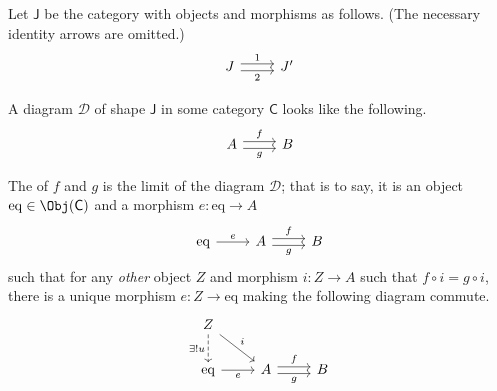 \documentclass[notes.tex]{subfiles}
\begin{document}
\begin{definition}[equalizer]
  \label{def:equalizer}
  Let $\mathsf{J}$ be the category with objects and morphisms as follows. (The necessary identity arrows are omitted.)
  \begin{equation*}
    \begin{tikzcd}
      J
      \arrow[r, shift left, "1"]
      \arrow[r, shift right, swap, "2"]
      & J'
    \end{tikzcd}
  \end{equation*}

  A diagram $\mathcal{D}$ of shape $\mathsf{J}$ in some category $\mathsf{C}$ looks like the following.
  \begin{equation*}
    \begin{tikzcd}
      A
      \arrow[r, shift left, "f"]
      \arrow[r, shift right, swap, "g"]
      & B
    \end{tikzcd}
  \end{equation*}

  The  of $f$ and $g$ is the limit of the diagram $\mathcal{D}$; that is to say, it is an object $\mathrm{eq} \in \Obj(\mathsf{C})$ and a morphism $e\colon \mathrm{eq} \to A$
  \begin{equation*}
    \begin{tikzcd}
      \mathrm{eq}
      \arrow[r, "e"]
      & A
      \arrow[r, shift left, "f"]
      \arrow[r, shift right, swap, "g"]
      & B
    \end{tikzcd}
  \end{equation*}
  such that for any \emph{other} object $Z$ and morphism $i\colon Z \to A$ such that $f \circ i = g \circ i$, there is a unique morphism $e\colon Z \to \mathrm{eq}$ making the following diagram commute.
  \begin{equation*}
    \begin{tikzcd}
      Z
      \arrow[d, swap, dashed, "\exists! u"]
      \arrow[dr, "i"]
      \\
      \mathrm{eq}
      \arrow[r, swap, "e"]
      & A
      \arrow[r, shift left, "f"]
      \arrow[r, shift right, swap, "g"]
      & B
    \end{tikzcd}
  \end{equation*}
\end{definition}
\end{document}
